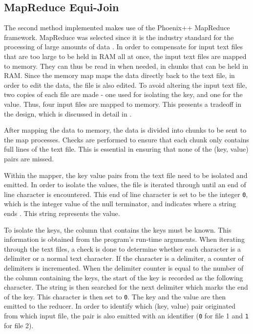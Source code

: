 \documentclass[10pt,twocolumn]{witseiepaper}
\begin{document}
\subsection{MapReduce Equi-Join}
The second method implemented makes use of the Phoenix++ MapReduce framework. MapReduce was selected since it is the industry standard for the processing of large amounts of data \cite{comparingMPIMapReduce}. In order to compensate for input text files that are too large to be held in RAM all at once, the input text files are mapped to memory. They can thus be read in when needed, in chunks that can be held in RAM. Since the memory map maps the data directly back to the text file, in order to edit the data, the file is also edited. To avoid altering the input text file, two copies of each file are made - one used for isolating the key, and one for the value. Thus, four input files are mapped to memory. This presents a tradeoff in the design, which is discussed in detail in .

After mapping the data to memory, the data is divided into chunks to be sent to the map processes. Checks are performed to ensure that each chunk only contains full lines of the text file. This is essential in ensuring that none of the (key, value) pairs are missed.

Within the mapper, the key value pairs from the text file need to be isolated and emitted. In order to isolate the values, the file is iterated through until an end of line character is encountered. This end of line character is set to be the integer \texttt{0}, which is the integer value of the null terminator, and indicates where a string ends \cite{phoenix}. This string represents the value.

To isolate the keys, the column that contains the keys must be known. This information is obtained from the program's run-time arguments. When iterating through the text files, a check is done to determine whether each character is a delimiter or a normal text character. If the character is a delimiter, a counter of delimiters is incremented. When the delimiter counter is equal to the number of the column containing the keys, the start of the key is recorded as the following character. The string is then searched for the next delimiter which marks the end of the key. This character is then set to \texttt{0}. The key and the value are then emitted to the reducer. In order to identify which (key, value) pair originated from which input file, the pair is also emitted with an identifier (\texttt{0} for file 1 and \texttt{1} for file 2).
\end{document}
